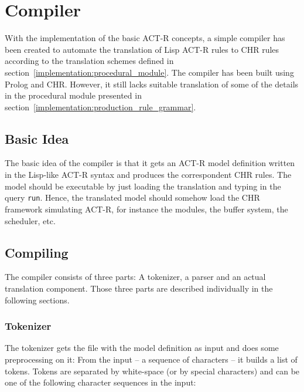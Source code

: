\section{Compiler}

With the implementation of the basic ACT-R concepts, a simple compiler has been created to automate the translation of Lisp ACT-R rules to CHR rules according to the translation schemes defined in section~\ref{implementation:procedural_module}. The compiler has been built using Prolog and CHR. However, it still lacks suitable translation of some of the details in the procedural module presented in section~\ref{implementation:production_rule_grammar}.

\subsection{Basic Idea}

The basic idea of the compiler is that it gets an ACT-R model definition written in the Lisp-like ACT-R syntax and produces the correspondent CHR rules. The model should be executable by just loading the translation and typing in the query \lstinline|run|. Hence, the translated model should somehow load the CHR framework simulating ACT-R, for instance the modules, the buffer system, the scheduler, etc. %

\subsection{Compiling}

The compiler consists of three parts: A tokenizer, a parser and an actual translation component. Those three parts are described individually in the following sections.

\subsubsection{Tokenizer}

The tokenizer gets the file with the model definition as input and does some preprocessing on it: From the input -- a sequence of characters -- it builds a list of tokens. Tokens are separated by white-space (or by special characters) and can be one of the following character sequences in the input:

